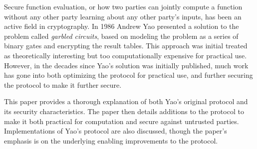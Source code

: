Secure function evaluation, or how two parties can jointly compute a function without any other party learning about any other party's inputs, has been an active field in cryptography. In 1986 Andrew Yao presented a solution to the problem called \emph{garbled circuits}, based on modeling the problem as a series of binary gates and encrypting the result tables. This approach was initial treated as theoretically interesting but too computationally expensive for practical use.  However, in the decades since Yao's solution was initially published, much work has gone into both optimizing the protocol for practical use, and further securing the protocol to make it further secure.

This paper provides a thorough explanation of both Yao's original protocol and its security characteristics.  The paper then details additions to the protocol to make it both practical for computation and secure against untrusted parties.  Implementations of Yao's protocol are also discussed, though the paper's emphasis is on the underlying enabling improvements to the protocol.
